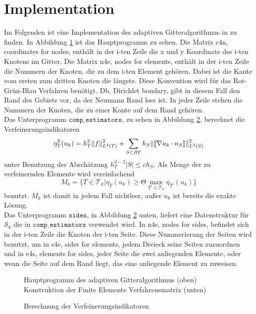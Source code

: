 \section{Implementation}
Im Folgenden ist eine Implementation des adaptiven Gitteralgorithmus in \matlab \: zu finden. In Abbildung \ref{main} ist das Hauptprogramm zu sehen. Die Matrix c4n, coordinates for nodes, enthält in der i-ten Zeile die x und y Koordinate des i-ten Knotens im Gitter. Die Matrix n4e, nodes for elements, enthält in der i-ten Zeile die Nummern der Knoten, die zu dem i-ten Element gehören. Dabei ist die Kante vom ersten zum dritten Knoten die längste. Diese Konvention wird für das Rot-Grün-Blau Verfahren benötigt. Db, Dirichlet bondary, gibt in diesem Fall den Rand des Gebiets vor, da der Neumann Rand leer ist. In jeder Zeile stehen die Nummern der Knoten, die zu einer Kante auf dem Rand gehören. \\
Das Unterprogramm $\texttt{comp\_estimators}$, zu sehen in Abbildung \ref{indi}, berechnet die Verfeinerungsindikatoren
\[
\eta^2_T(u_k) = h^2_T\|f\|^2_{L^2(T)} + \sum_{S\subset\partial T} h_S\|\llbracket \nabla u_k \cdot n_S\rrbracket\|^2_{L^2(S)} 
\]
unter Benutzung der Abschätzung $h_T^{d-2}|S| \leq ch_S$.
Als Menge der zu verfeinernden Elemente wird vereinfachend
\[
M_k = \{T\in\mathscr{T}_k | \eta_T(u_k)\geq \Theta \max_{T'\in \mathscr{T}_k} \eta_{T'}(u_k)\}
\]
benutzt. $M_k$ ist damit in jedem Fall nichtleer, außer $u_k$ ist bereits die exakte Lösung. \\
Das Unterprogramm $\texttt{sides}$, in Abbildung \ref{indi} unten, liefert eine Datenstruktur für $\mathscr{S}_k$ die in $\texttt{comp\_estimators}$ verwendet wird. In n4s, nodes for sides, befindet sich in der i-ten Zeile die Knoten der i-ten Seite. Diese Nummerierung der Seiten wird benutzt, um in s4e, sides for elements, jedem Dreieck seine Seiten zuzuordnen und in e4s, elements for sides, jeder Seite die zwei anliegenden Elemente, oder wenn die Seite auf dem Rand liegt, das eine anliegende Element zu zuweisen.

\begin{figure}[!htbp]
	
	\caption{ \label{main}Hauptprogramm des adaptiven Gitteralgorithmus (oben) Konstruktion der Finite Elemente Verfahrensmatrix (unten)}
\end{figure}
\begin{figure}[!htbp]
	
	\caption{\label{indi}Berechnung der Verfeinerungsindikatoren}
\end{figure}

